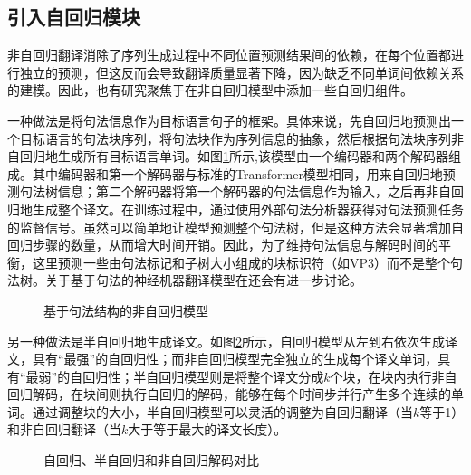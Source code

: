 
\subsection{引入自回归模块}

\parinterval 非自回归翻译消除了序列生成过程中不同位置预测结果间的依赖，在每个位置都进行独立的预测，但这反而会导致翻译质量显著下降，因为缺乏不同单词间依赖关系的建模。因此，也有研究聚焦于在非自回归模型中添加一些自回归组件。

\parinterval 一种做法是将句法信息作为目标语言句子的框架。具体来说，先自回归地预测出一个目标语言的句法块序列，将句法块作为序列信息的抽象，然后根据句法块序列非自回归地生成所有目标语言单词。如图\ref{fig:14-21}所示,该模型由一个编码器和两个解码器组成。其中编码器和第一个解码器与标准的Transformer模型相同，用来自回归地预测句法树信息；第二个解码器将第一个解码器的句法信息作为输入，之后再非自回归地生成整个译文。在训练过程中，通过使用外部句法分析器获得对句法预测任务的监督信号。虽然可以简单地让模型预测整个句法树，但是这种方法会显著增加自回归步骤的数量，从而增大时间开销。因此，为了维持句法信息与解码时间的平衡，这里预测一些由句法标记和子树大小组成的块标识符（如VP3）而不是整个句法树。关于基于句法的神经机器翻译模型在{\chapterfifteen}还会有进一步讨论。

\begin{figure}[htp]
\centering

\caption{基于句法结构的非自回归模型}
\label{fig:14-21}
\end{figure}

\parinterval 另一种做法是半自回归地生成译文。如图\ref{fig:14-20}所示，自回归模型从左到右依次生成译文，具有“最强”的自回归性；而非自回归模型完全独立的生成每个译文单词，具有“最弱”的自回归性；半自回归模型则是将整个译文分成$k$个块，在块内执行非自回归解码，在块间则执行自回归的解码，能够在每个时间步并行产生多个连续的单词。通过调整块的大小，半自回归模型可以灵活的调整为自回归翻译（当$k$等于1）和非自回归翻译（当$k$大于等于最大的译文长度）。

\begin{figure}[htp]
\centering

\caption{自回归、半自回归和非自回归解码对比}
\label{fig:14-20}
\end{figure}

